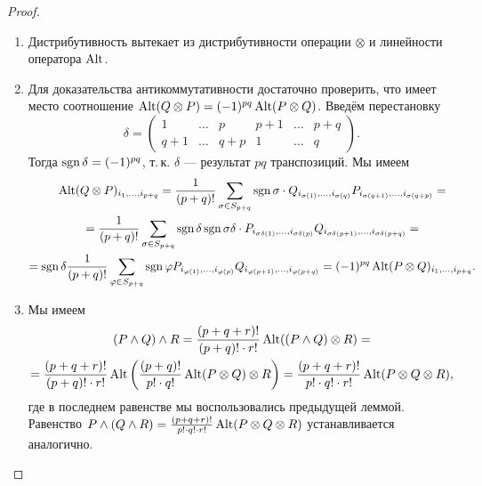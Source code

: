 \begin{proof}
    \begin{enumerate}
        \item Дистрибутивность вытекает из дистрибутивности операции $\otimes$ и линейности оператора $\operatorname{Alt}$.
        \item Для доказательства антикоммутативности достаточно проверить, что имеет место соотношение $\operatorname{Alt}(Q \otimes P) = (-1)^{pq}\operatorname{Alt}(P \otimes Q)$. Введём перестановку
            \[
                \delta =
                \begin{pmatrix}
                    1 & \ldots & p & p + 1 & \ldots & p + q\\
                    q + 1 & \ldots & q + p & 1 & \ldots & q
                \end{pmatrix}.
            \]
            Тогда $\operatorname{sgn}\delta = (-1)^{pq}$, т.\,к. $\delta$ --- результат $pq$ транспозиций. Мы имеем
            \begin{multline*}
                \operatorname{Alt}(Q \otimes P)_{i_1, \ldots, i_{p + q}} = \frac{1}{(p + q)!}\sum_{\sigma \in S_{p + q}}\operatorname{sgn}\sigma \cdot Q_{i_{\sigma(1)}, \ldots, i_{\sigma(q)}}P_{i_{\sigma(q + 1)}, \ldots, i_{\sigma(q + p)}} =\\ = \frac{1}{(p + q)!}\sum_{\sigma \in S_{p + q}}\operatorname{sgn}\delta\operatorname{sgn}\sigma\delta \cdot P_{i_{\sigma\delta(1)}, \ldots, i_{\sigma\delta(p)}}Q_{i_{\sigma\delta(p + 1)}, \ldots, i_{\sigma\delta(p + q)}} =\\ =\operatorname{sgn}\delta\frac{1}{(p + q)!}\sum_{\varphi \in S_{p + q}}\operatorname{sgn}\varphi P_{i_{\varphi(1)}, \ldots, i_{\varphi(p)}} Q_{i_{\varphi(p + 1)}, \ldots, i_{\varphi(p + q)}} = (-1)^{pq}\operatorname{Alt}(P \otimes Q)_{i_1, \ldots, i_{p + q}}.
            \end{multline*}
        \item Мы имеем
            \begin{multline*}
                (P \wedge Q) \wedge R = \frac{(p + q + r)!}{(p + q)! \cdot r!}\operatorname{Alt}((P \wedge Q) \otimes R) =\\ = \frac{(p + q + r)!}{(p + q)! \cdot r!}\operatorname{Alt}\left(\frac{(p + q)!}{p! \cdot q!}\operatorname{Alt}(P \otimes Q) \otimes R\right) = \frac{(p + q + r)!}{p! \cdot q! \cdot r!}\operatorname{Alt}(P \otimes Q \otimes R),
            \end{multline*}
            где в последнем равенстве мы воспользовались предыдущей леммой. Равенство $P \wedge (Q \wedge R) = \frac{(p + q + r)!}{p! \cdot q! \cdot r!}\operatorname{Alt}(P \otimes Q \otimes R)$ устанавливается аналогично.
    \end{enumerate}
\end{proof}

